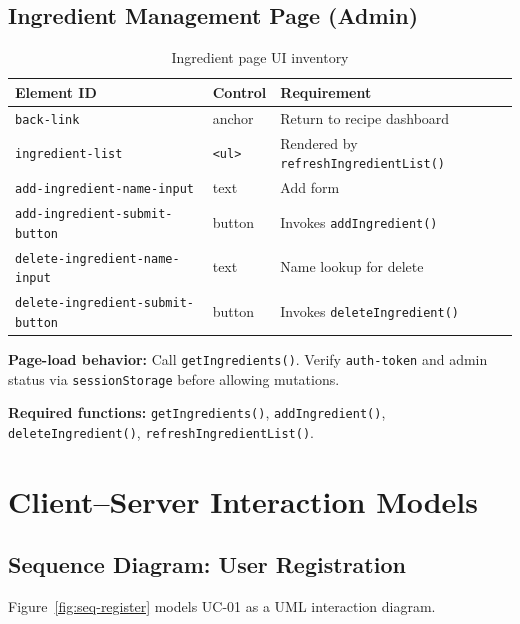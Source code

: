 \documentclass{article}
\begin{document}
\subsection{Ingredient Management Page (Admin)}
\begin{table}[htbp]
\centering
\footnotesize
\begin{tabular}{@{}lll@{}}
\toprule
\textbf{Element ID} & \textbf{Control} & \textbf{Requirement} \\
\midrule
\texttt{back-link} & anchor & Return to recipe dashboard \\
\texttt{ingredient-list} & \texttt{<ul>} & Rendered by \texttt{refreshIngredientList()} \\
\texttt{add-ingredient-name-input} & text & Add form \\
\texttt{add-ingredient-submit-button} & button & Invokes \texttt{addIngredient()} \\
\texttt{delete-ingredient-name-input} & text & Name lookup for delete \\
\texttt{delete-ingredient-submit-button} & button & Invokes \texttt{deleteIngredient()} \\
\bottomrule
\end{tabular}
\caption{Ingredient page UI inventory}
\end{table}

\textbf{Page-load behavior:} Call \texttt{getIngredients()}. Verify \texttt{auth-token} and admin status via \texttt{sessionStorage} before allowing mutations.

\textbf{Required functions:} \texttt{getIngredients()}, \texttt{addIngredient()}, \texttt{deleteIngredient()}, \texttt{refreshIngredientList()}.

\section{Client--Server Interaction Models}
\label{sec:interaction}

\subsection{Sequence Diagram: User Registration}
Figure~\ref{fig:seq-register} models UC-01 as a UML interaction diagram.
\end{document}
